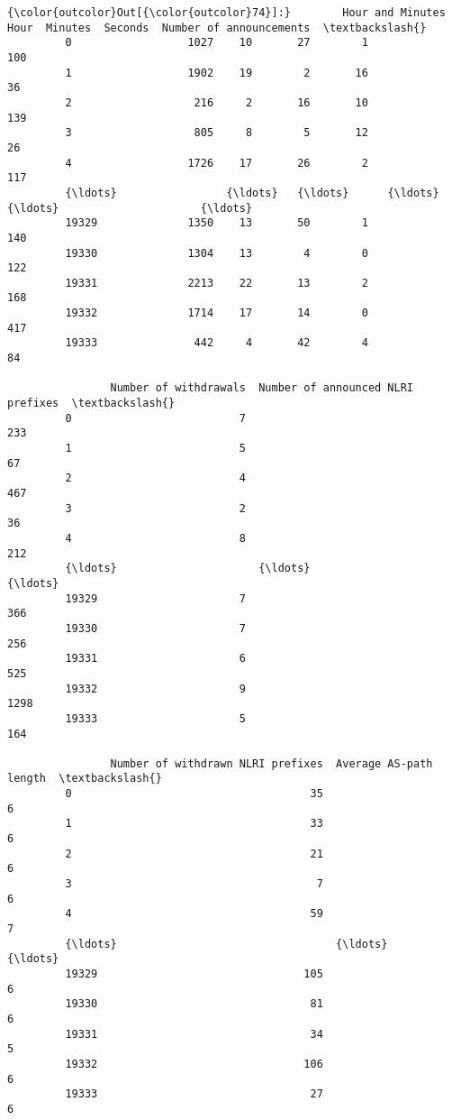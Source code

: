 \documentclass[11pt]{article}
\begin{document}
\begin{Verbatim}[commandchars=\\\{\}]
{\color{outcolor}Out[{\color{outcolor}74}]:}        Hour and Minutes  Hour  Minutes  Seconds  Number of announcements  \textbackslash{}
         0                  1027    10       27        1                      100   
         1                  1902    19        2       16                       36   
         2                   216     2       16       10                      139   
         3                   805     8        5       12                       26   
         4                  1726    17       26        2                      117   
         {\ldots}                 {\ldots}   {\ldots}      {\ldots}      {\ldots}                      {\ldots}   
         19329              1350    13       50        1                      140   
         19330              1304    13        4        0                      122   
         19331              2213    22       13        2                      168   
         19332              1714    17       14        0                      417   
         19333               442     4       42        4                       84   
         
                Number of withdrawals  Number of announced NLRI prefixes  \textbackslash{}
         0                          7                                233   
         1                          5                                 67   
         2                          4                                467   
         3                          2                                 36   
         4                          8                                212   
         {\ldots}                      {\ldots}                                {\ldots}   
         19329                      7                                366   
         19330                      7                                256   
         19331                      6                                525   
         19332                      9                               1298   
         19333                      5                                164   
         
                Number of withdrawn NLRI prefixes  Average AS-path length  \textbackslash{}
         0                                     35                       6   
         1                                     33                       6   
         2                                     21                       6   
         3                                      7                       6   
         4                                     59                       7   
         {\ldots}                                  {\ldots}                     {\ldots}   
         19329                                105                       6   
         19330                                 81                       6   
         19331                                 34                       5   
         19332                                106                       6   
         19333                                 27                       6   
         

\end{Verbatim}
\end{document}
